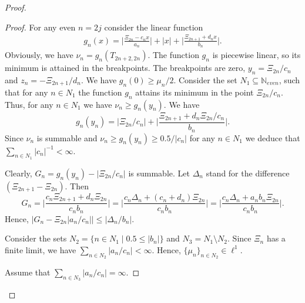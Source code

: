 \begin{proof}
\begin{proof}
        For any even $n = 2j$ consider the linear function
        \begin{align*}
          g_{n}(x) = \Big\lvert \frac{\Xi_{2n} - c_{n} x}{a_{n}} \Big\rvert +
                       \lvert x \rvert +
                     \Big\lvert \frac{\Xi_{2n+1} + d_{n} x}{b_{n}} \Big\rvert.
        \end{align*}
        Obviously, we have $\nu_{n} = g_{n}(T_{2n+2, 2n})$.
        The function $g_n$ is piecewise linear, so its minimum is attained in the breakpoints.
        The breakpoints are zero, $y_n = \Xi_{2n}/c_n$ and $z_n = -\Xi_{2n+1}/d_n$.
        We have $g_n(0) \geq \mu_n/2$.
        Consider the set $N_1 \subseteq \mathbb{N}_{{even}}$, such that for any $n \in N_1$ the function $g_n$ attains its minimum in
          the point $\Xi_{2n}/c_n$.
        Thus, for any $n\in N_1$ we have $\nu_n \geq g_n(y_n)$.
        We have
        \[
          g_n(y_n) = \Big\lvert \Xi_{2n}/c_n \Big\rvert +
                   \Big\lvert \frac{\Xi_{2n+1} + d_{n} \Xi_{2n}/c_n}{b_{n}} \Big\rvert.
        \]
        Since $\nu_n$ is summable and $\nu_n \geq g_n(y_n) \geq 0.5/|c_n|$ for any $n \in N_1$
          we deduce that $\sum_{n \in N_1} |c_n|^{-1} < \infty$.

        Clearly, $G_n = g_n(y_n) - \Big\lvert \Xi_{2n}/c_n \Big\rvert$ is summable.
        Let $\Delta_n$ stand for the difference $\left(\Xi_{2n+1} - \Xi_{2n}\right)$.
        Then
        \[
          G_n = \Big\lvert \frac{c_n \Xi_{2n+1} + d_{n} \Xi_{2n}}{c_n b_n} \Big\rvert
              = \Big\lvert \frac{c_n \Delta_n + (c_n + d_n) \Xi_{2n}}{c_n b_n} \Big\rvert
              = \Big\lvert \frac{c_n \Delta_n + a_n b_n\Xi_{2n}}{c_n b_n} \Big\rvert.
        \]
        Hence, $\big\lvert G_n - \Xi_{2n}\lvert a_n/c_n\rvert \big\rvert \leq \lvert \Delta_n/b_n \rvert$.

        Consider the sets $N_2 = \{n\in N_1 \mid 0.5 \leq \lvert b_n \rvert\}$ and $N_3 = N_1 \setminus N_2$.
        Since $\Xi_n$ has a finite limit, we have $\sum_{n \in N_2} \lvert a_n/c_n \rvert < \infty$.
        Hence, $\{\mu_n\}_{n \in N_2} \in \ell^1$.

        Assume that $\sum_{n \in N_3} \lvert a_n/c_n\rvert = \infty$.


\end{proof}
\end{proof}
